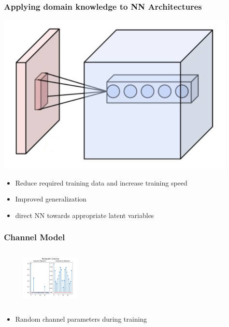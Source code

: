 \documentclass{beamer}
\begin{document}
\begin{frame}
	\frametitle{Applying domain knowledge to NN Architectures}
	\includegraphics[scale=.25]{Images/Conv_layer.png}
	\begin{itemize}
		\item Reduce required training data and increase training speed
		\item Improved generalization
		\item direct NN towards appropriate latent variables
	\end{itemize}
\end{frame}


\begin{frame}
	\frametitle{Channel Model}
	\begin{figure}
			\includegraphics[scale=.6, height=3cm, width=3cm]{Images/Output/Multipath_Channel.png}
	\end{figure}
	\begin{itemize}
		\item Random channel parameters during training
	\end{itemize}
\end{frame}
\end{document}
